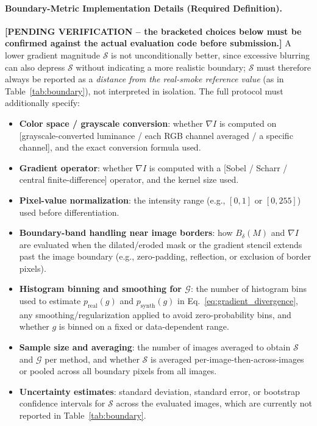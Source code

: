\documentclass[journal]{IEEEtran}
\begin{document}
\paragraph{Boundary-Metric Implementation Details (Required Definition).}
\textbf{[PENDING VERIFICATION -- the bracketed choices below must be
confirmed against the actual evaluation code before submission.]} A lower
gradient magnitude $\mathcal{S}$ is not unconditionally better, since
excessive blurring can also depress $\mathcal{S}$ without indicating a
more realistic boundary; $\mathcal{S}$ must therefore always be reported
as a \emph{distance from the real-smoke reference value} (as in
Table~\ref{tab:boundary}), not interpreted in isolation. The full protocol
must additionally specify:
\begin{itemize}
    \item \textbf{Color space / grayscale conversion}: whether $\nabla I$
    is computed on [grayscale-converted luminance / each RGB channel
    averaged / a specific channel], and the exact conversion formula used.
    \item \textbf{Gradient operator}: whether $\nabla I$ is computed with
    a [Sobel / Scharr / central finite-difference] operator, and the
    kernel size used.
    \item \textbf{Pixel-value normalization}: the intensity range (e.g.,
    $[0,1]$ or $[0,255]$) used before differentiation.
    \item \textbf{Boundary-band handling near image borders}: how
    $B_{\delta}(M)$ and $\nabla I$ are evaluated when the dilated/eroded
    mask or the gradient stencil extends past the image boundary (e.g.,
    zero-padding, reflection, or exclusion of border pixels).
    \item \textbf{Histogram binning and smoothing for $\mathcal{G}$}: the
    number of histogram bins used to estimate $p_{\mathrm{real}}(g)$ and
    $p_{\mathrm{synth}}(g)$ in Eq.~\eqref{eq:gradient_divergence}, any
    smoothing/regularization applied to avoid zero-probability bins, and
    whether $g$ is binned on a fixed or data-dependent range.
    \item \textbf{Sample size and averaging}: the number of images
    averaged to obtain $\mathcal{S}$ and $\mathcal{G}$ per method, and
    whether $\mathcal{S}$ is averaged per-image-then-across-images or
    pooled across all boundary pixels from all images.
    \item \textbf{Uncertainty estimates}: standard deviation, standard
    error, or bootstrap confidence intervals for $\mathcal{S}$ across the
    evaluated images, which are currently not reported in
    Table~\ref{tab:boundary}.
\end{itemize}
\end{document}
